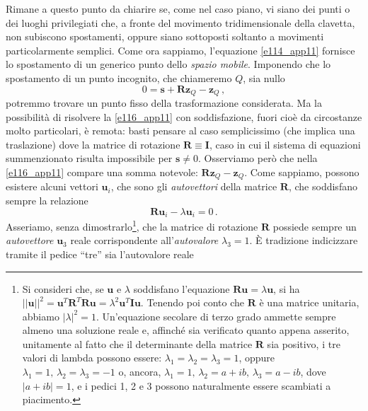 \noindent Rimane a questo punto da chiarire se, come nel caso piano, vi siano dei punti
o dei luoghi privilegiati che,
a fronte del movimento tridimensionale della clavetta,
non subiscono spostamenti, oppure siano sottoposti
soltanto a movimenti particolarmente semplici.
Come ora sappiamo, l'equazione \ref{e114_app11} fornisce lo spostamento di un
generico punto dello {\em spazio mobile}.
Imponendo che lo spostamento di un punto incognito,
che chiameremo
$Q$, sia nullo
\begin{equation}
0=
{{\bm s}}+
{\bm R}{\bm z}_{\scriptscriptstyle{Q}}-{\bm z}_{\scriptscriptstyle{Q}}\,,
\label{e116_app11}
\end{equation}
\noindent potremmo trovare un punto fisso della trasformazione considerata.
Ma la possibilit\`a di risolvere la \ref{e116_app11} con soddisfazione,
fuori cio\`e da circostanze molto particolari, \`e remota: basti pensare al
caso semplicissimo (che implica una traslazione) dove la matrice di
rotazione $\bm R\equiv \bm I$, caso in cui il sistema di equazioni
summenzionato risulta impossibile per
${{\bm s}}\ne0$.
Osserviamo per\`o che nella \ref{e116_app11} compare una somma notevole:
$ {\bm R}{\bm z}_{\scriptscriptstyle{Q}}-{\bm z}_{\scriptscriptstyle{Q}}$.
Come sappiamo, possono esistere alcuni vettori ${\bm u}_i$, che sono
gli {\em autovettori} della
matrice $\bm R$, che soddisfano sempre la relazione 
\begin{equation}
{\bm R}{\bm u}_i-\lambda{\bm u}_i=0\,.
\label{e117_app11}
\end{equation}
\noindent Asseriamo, senza dimostrarlo\footnote
{
Si consideri che, se $\bm u$ e $\lambda$ soddisfano l'equazione
${\bm R}{\bm u}= \lambda {\bm u}$, si ha 
$|| {\bm u}||^2 = {\bm u}^T{\bm R}^T{\bm R}{\bm u}= \lambda^2 {\bm u}^T{\bm I}{\bm u}$.
Tenendo poi conto che $\bm R$ \`e una matrice unitaria,
abbiamo $|\lambda|^2=1$. Un'equazione secolare di terzo grado ammette
sempre almeno una soluzione reale e, affinch\'e sia verificato quanto 
appena asserito, unitamente al fatto che il determinante della
matrice ${\bm R}$ sia positivo, i tre valori di lambda possono essere:
$\lambda_1=\lambda_2=\lambda_3=1$, oppure
$\lambda_1=1,\, \lambda_2=\lambda_3=-1$ o,
ancora, $\lambda_1=1,\, \lambda_2=a+ib,\,\lambda_3=a-ib$, dove $|a+ib|=1$,
e i pedici 1, 2 e 3 possono naturalmente essere scambiati a piacimento.
},
che la matrice di rotazione $\bm R$
possiede sempre
un {\em autovettore} ${\bm u}_3$ reale corrispondente all'{\em autovalore}
 $\lambda_3=  1$. \`E tradizione indicizzare 
tramite il pedice ``tre'' sia l'autovalore reale
